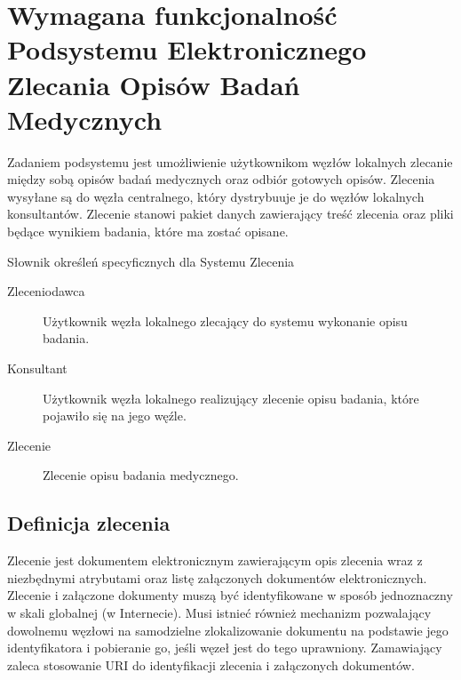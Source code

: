 \documentclass[a4paper]{report}
\begin{document}
\chapter[Podsystem Elektronicznego Zlecania Opisów Badań]{Wymagana funkcjonalność Podsystemu Elektronicznego Zlecania Opisów Badań Medycznych}

Zadaniem podsystemu jest umożliwienie użytkownikom węzłów lokalnych zlecanie między sobą opisów
badań medycznych oraz odbiór gotowych opisów. Zlecenia wysyłane są do węzła centralnego, który
dystrybuuje je do węzłów lokalnych konsultantów. Zlecenie stanowi pakiet danych zawierający
treść zlecenia oraz pliki będące wynikiem badania, które ma zostać opisane. 

Słownik określeń specyficznych dla Systemu Zlecenia
\begin{description}
  \item[Zleceniodawca] Użytkownik węzła lokalnego zlecający do systemu wykonanie opisu badania.
  \item[Konsultant] Użytkownik węzła lokalnego realizujący zlecenie opisu badania, które pojawiło się na jego węźle.
  \item[Zlecenie] Zlecenie opisu badania medycznego.
\end{description}

\section{Definicja zlecenia}

Zlecenie jest dokumentem elektronicznym zawierającym opis zlecenia wraz z niezbędnymi atrybutami oraz listę załączonych dokumentów elektronicznych. Zlecenie i załączone dokumenty muszą być identyfikowane w sposób jednoznaczny w skali globalnej (w Internecie). Musi istnieć również mechanizm pozwalający dowolnemu węzłowi na samodzielne zlokalizowanie dokumentu na podstawie jego identyfikatora i pobieranie go, jeśli węzeł jest do tego uprawniony. Zamawiający zaleca stosowanie URI do identyfikacji zlecenia i załączonych dokumentów.
\end{document}
